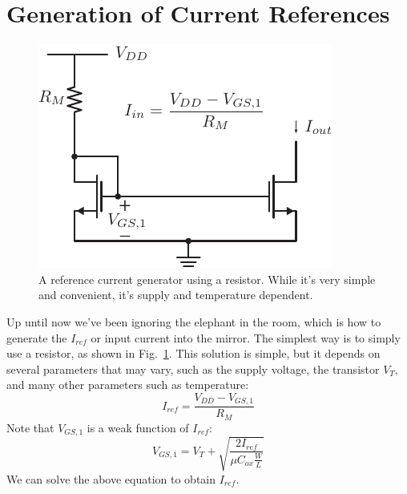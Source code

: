 \section{Generation of Current References}
\label{sec:Ireference}
\begin{figure}[tb]
\centering
\includegraphics[scale=1]{mirror_resistor.pdf}
\caption{A reference current generator using a resistor.  While it's very simple and convenient, it's supply and temperature dependent.}
\label{fig:iref_gen_rs}
\end{figure}
Up until now we've been ignoring the elephant in the room, which is how to generate the $I_{ref}$ or input current into the mirror.  The simplest way is to simply use a resistor, as shown in Fig.~\ref{fig:iref_gen_rs}.  This solution is simple, but it depends on several parameters that may vary, such as the supply voltage, the transistor $V_T$, and many other parameters such as temperature:  
    \begin{equation}
        I_{ref} = \frac{V_{DD} - V_{GS,1}}{R_M}  
    \end{equation}
Note that $V_{GS,1}$ is a weak function of $I_{ref}$:
    \begin{equation}
        V_{GS,1} = V_T + \sqrt{\frac{2 I_{ref}}{\mu C_{ox} \frac{W}{L}}}
    \end{equation}
We can solve the above equation to obtain $I_{ref}$.
